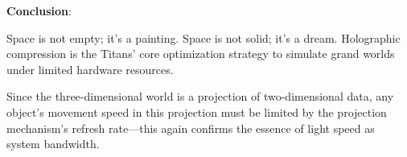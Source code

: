 \textbf{Conclusion}:

Space is not empty; it's a painting. Space is not solid; it's a dream. Holographic compression is the Titans' core optimization strategy to simulate grand worlds under limited hardware resources.

Since the three-dimensional world is a projection of two-dimensional data, any object's movement speed in this projection must be limited by the projection mechanism's refresh rate---this again confirms the essence of light speed as system bandwidth.
